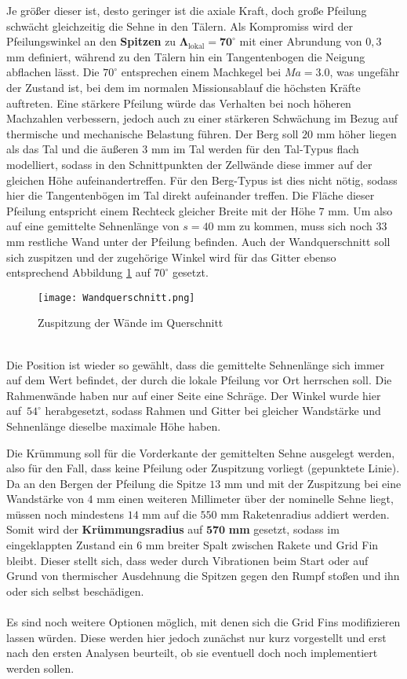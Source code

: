 Je größer dieser ist, desto geringer ist die axiale Kraft, doch große Pfeilung schwächt gleichzeitig die Sehne in den Tälern. Als Kompromiss wird der Pfeilungswinkel an den \textbf{Spitzen} zu $\mathbf{\Lambda_\mathrm{lokal}=70^\circ}$ mit einer Abrundung von $0,3$ mm definiert, während zu den Tälern hin ein Tangentenbogen die Neigung abflachen lässt. Die $70^\circ$ entsprechen einem Machkegel bei $Ma = 3.0$, was ungefähr der Zustand ist, bei dem im normalen Missionsablauf die höchsten Kräfte auftreten. Eine stärkere Pfeilung würde das Verhalten bei noch höheren Machzahlen verbessern, jedoch auch zu einer stärkeren Schwächung im Bezug auf thermische und mechanische Belastung führen. Der Berg soll $20$ mm höher liegen als das Tal und die äußeren $3$ mm im Tal werden für den Tal-Typus flach modelliert, sodass in den Schnittpunkten der Zellwände diese immer auf der gleichen Höhe aufeinandertreffen. Für den Berg-Typus ist dies nicht nötig, sodass hier die Tangentenbögen im Tal direkt aufeinander treffen. Die Fläche dieser Pfeilung entspricht einem Rechteck gleicher Breite mit der Höhe $7$ mm. Um also auf eine gemittelte Sehnenlänge von $s=40$ mm zu kommen, muss sich noch $33$ mm restliche Wand unter der Pfeilung befinden.
Auch der Wandquerschnitt soll sich zuspitzen und der zugehörige Winkel wird für das Gitter ebenso entsprechend Abbildung \ref{abb_wandq} auf $70^\circ$ gesetzt. 
\begin{figure}
	\centering
	\texttt{[image: Wandquerschnitt.png]}
	\caption{Zuspitzung der Wände im Querschnitt}
	\label{abb_wandq}
\end{figure}\\
Die Position ist wieder so gewählt, dass die gemittelte Sehnenlänge sich immer auf dem Wert befindet, der durch die lokale Pfeilung vor Ort herrschen soll. Die Rahmenwände haben nur auf einer Seite eine Schräge. Der Winkel wurde hier auf\ $54^\circ$ herabgesetzt, sodass Rahmen und Gitter bei gleicher Wandstärke und Sehnenlänge dieselbe maximale Höhe haben.

Die Krümmung soll für die Vorderkante der gemittelten Sehne ausgelegt werden, also für den Fall, dass keine Pfeilung oder Zuspitzung vorliegt (gepunktete Linie). Da an den Bergen der Pfeilung die Spitze $13$ mm und mit der Zuspitzung bei eine Wandstärke von $4$ mm einen weiteren Millimeter über der nominelle Sehne liegt, müssen noch mindestens $14$ mm auf die $550$ mm Raketenradius addiert werden. Somit wird der \textbf{Krümmungsradius} auf $\mathbf{570}$ \textbf{mm} gesetzt, sodass im eingeklappten Zustand ein $6$ mm breiter Spalt zwischen Rakete und Grid Fin bleibt. Dieser stellt sich, dass weder durch Vibrationen beim Start oder auf Grund von thermischer Ausdehnung die Spitzen gegen den Rumpf stoßen und ihn oder sich selbst beschädigen.
\\~\\
Es sind noch weitere Optionen möglich, mit denen sich die Grid Fins modifizieren lassen würden. Diese werden hier jedoch zunächst nur kurz vorgestellt und erst nach den ersten Analysen beurteilt, ob sie eventuell doch noch implementiert werden sollen.

